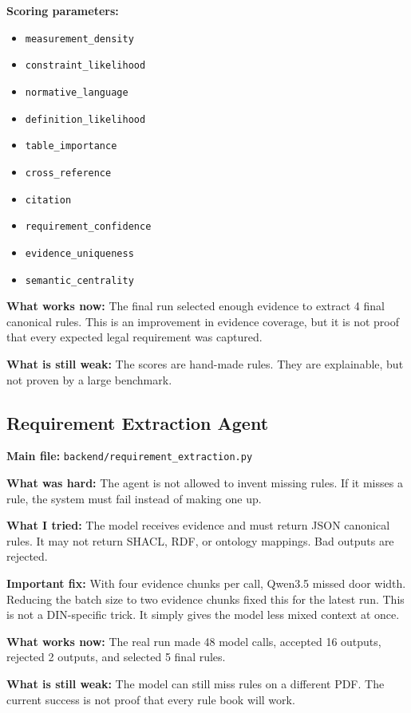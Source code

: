 \documentclass[11pt,a4paper]{article}
\begin{document}
\textbf{Scoring parameters:}
\begin{itemize}
  \item \texttt{measurement\_density}
  \item \texttt{constraint\_likelihood}
  \item \texttt{normative\_language}
  \item \texttt{definition\_likelihood}
  \item \texttt{table\_importance}
  \item \texttt{cross\_reference}
  \item \texttt{citation}
  \item \texttt{requirement\_confidence}
  \item \texttt{evidence\_uniqueness}
  \item \texttt{semantic\_centrality}
\end{itemize}

\textbf{What works now:}
The final run selected enough evidence to extract 4 final canonical rules. This is an improvement in evidence coverage, but it is not proof that every expected legal requirement was captured.

\textbf{What is still weak:}
The scores are hand-made rules. They are explainable, but not proven by a large benchmark.

\subsection{Requirement Extraction Agent}
\textbf{Main file:} \texttt{backend/requirement\_extraction.py}

\textbf{What was hard:}
The agent is not allowed to invent missing rules. If it misses a rule, the system must fail instead of making one up.

\textbf{What I tried:}
The model receives evidence and must return JSON canonical rules. It may not return SHACL, RDF, or ontology mappings. Bad outputs are rejected.

\textbf{Important fix:}
With four evidence chunks per call, Qwen3.5 missed door width. Reducing the batch size to two evidence chunks fixed this for the latest run. This is not a DIN-specific trick. It simply gives the model less mixed context at once.

\textbf{What works now:}
The real run made 48 model calls, accepted 16 outputs, rejected 2 outputs, and selected 5 final rules.

\textbf{What is still weak:}
The model can still miss rules on a different PDF. The current success is not proof that every rule book will work.
\end{document}
